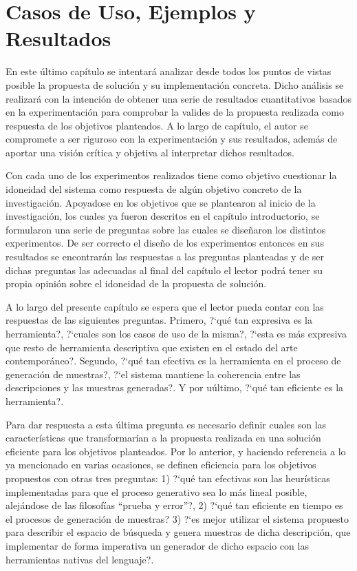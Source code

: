 \chapter{Casos de Uso, Ejemplos y Resultados}\label{chapter:implementation}

En este último capítulo se intentará analizar desde todos los puntos de vistas
posible la propuesta de solución y su implementación concreta. Dicho análisis se
realizará con la intención de obtener una serie de resultados cuantitativos
basados en la experimentación para comprobar la valides de la propuesta realizada
como respuesta de los objetivos planteados. A lo largo de capítulo, el autor se
compromete a ser riguroso con la experimentación y sus resultados, además de aportar
una visión crítica y objetiva al interpretar dichos resultados.

Con cada uno de los experimentos realizados tiene como objetivo cuestionar la idoneidad
del sistema como respuesta de algún objetivo concreto de la investigación. Apoyadose en
los objetivos que se plantearon al inicio de la investigación, los cuales ya fueron
descritos en el capítulo introductorio, se formularon una serie de preguntas sobre las
cuales se diseñaron los distintos experimentos. De ser correcto el diseño de los
experimentos entonces en sus resultados se encontrarán las respuestas a las preguntas
planteadas y de ser dichas preguntas las adecuadas al final del capítulo el lector podrá
tener su propia opinión sobre el idoneidad de la propuesta de solución.

A lo largo del presente capítulo se espera que el lector pueda contar con las respuestas
de las siguientes preguntas. Primero, ?`qué tan expresiva es la herramienta?, ?`cuales son los
casos de uso de la misma?, ?`esta es más expresiva que resto de herramienta descriptiva que existen
en el estado del arte contemporáneo?. Segundo, ?`qué tan efectiva es la herramienta en el
proceso de generación de muestras?, ?`el sistema mantiene la coherencia entre las descripciones
y las muestras generadas?. Y por uúltimo, ?`qué tan eficiente es la herramienta?.

Para dar respuesta a esta última pregunta es necesario definir cuales son las características
que transformarían a la propuesta realizada en una solución eficiente para los objetivos
planteados. Por lo anterior, y haciendo referencia a lo ya mencionado en varias ocasiones,
se definen eficiencia para los objetivos propuestos con otras tres preguntas: 1) ?`qué tan
efectivas son las heurísticas implementadas para que el proceso generativo sea lo más lineal
posible, alejándose de las filosofías ``prueba y error''?, 2) ?`qué tan eficiente en tiempo es el
procesos de generación de muestras? 3) ?`es mejor utilizar el sistema propuesto para describir el
espacio de búsqueda y genera muestras de dicha descripción, que implementar de forma imperativa
un generador de dicho espacio con las herramientas nativas del lenguaje?.

